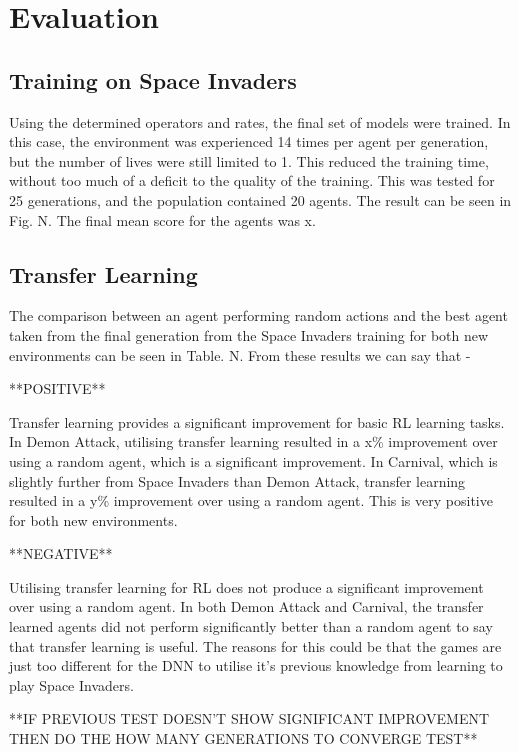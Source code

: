 \chapter{Evaluation}

\label{ch:eval}

\section{Training on Space Invaders}

Using the determined operators and rates, the final set of models were trained. In this case, the environment was experienced 14 times per agent per generation, but the number of lives were still limited to 1. This reduced the training time, without too much of a deficit to the quality of the training.  This was tested for 25 generations, and the population contained 20 agents. The result can be seen in Fig. N. The final mean score for the agents was x.

\section{Transfer Learning}

The comparison between an agent performing random actions and the best agent taken from the final generation from the Space Invaders training for both new environments can be seen in Table. N. From these results we can say that -

**POSITIVE**

Transfer learning provides a significant improvement for basic RL learning tasks. In Demon Attack, utilising transfer learning resulted in a x\% improvement over using a random agent, which is a significant improvement. In Carnival, which is slightly further from Space Invaders than Demon Attack, transfer learning resulted in a y\% improvement over using a random agent. This is very positive for both new environments.

**NEGATIVE**

Utilising transfer learning for RL does not produce a significant improvement over using a random agent. In both Demon Attack and Carnival, the transfer learned agents did not perform significantly better than a random agent to say that transfer learning is useful. The reasons for this could be that the games are just too different for the DNN to utilise it's previous knowledge from learning to play Space Invaders.




**IF PREVIOUS TEST DOESN'T SHOW SIGNIFICANT IMPROVEMENT THEN DO THE HOW MANY GENERATIONS TO CONVERGE TEST**
